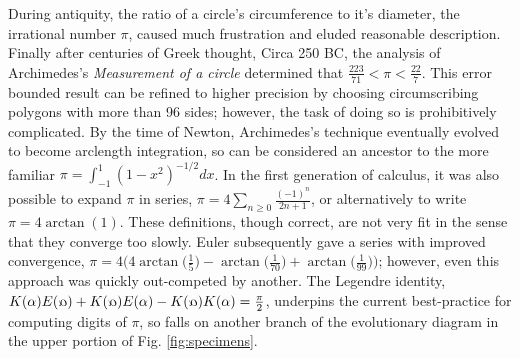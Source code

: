 \documentclass[nofootinbib,preprint]{revtex4-1}
\newcommand{\rev}[1]{\text{\reflectbox{$#1$}}}
\begin{document}
During antiquity, the ratio of a circle's circumference to it's diameter, the irrational number 
$\pi$, caused much frustration and eluded reasonable description. Finally after centuries of Greek 
thought, Circa 250 BC, the analysis of Archimedes's \textit{Measurement of a circle} determined 
that $\frac{223}{71}< \pi <\frac{22}{7}$. 
This error bounded result can be refined to higher precision by choosing circumscribing 
polygons with more than 96 sides; however, the task of doing so is prohibitively complicated. 
By the time of Newton, Archimedes's technique eventually evolved to become arclength 
integration, so can be considered an ancestor to the more familiar ${\pi = \int_{-1}^{1} (1-x^2)^{-1/2}dx}$. 
In the first generation of calculus, it was also possible to expand $\pi$ in 
series, $\pi=4\sum_{n\ge0} \frac{(-1)^n}{2n+1}$, or alternatively to write $\pi=4 \arctan(1)$. 
These definitions, though correct, are not very fit in the sense that they converge
too slowly. Euler subsequently gave a series with improved convergence,
${\pi = 4\Big(4\arctan\big(\tfrac{1}{5}\big)-\arctan\big(\tfrac{1}{70}\big)
+\arctan\big(\tfrac{1}{99}\big)\Big)}$; however, even this approach was quickly 
out-competed by another. The Legendre identity, 
$K(\alpha)E(\rev{\alpha})+K(\rev{\alpha})E(\alpha)-K(\rev{\alpha})K(\alpha)=\frac{\pi}{2}$,
underpins the current best-practice for computing digits of $\pi$, so falls on
another branch of the evolutionary diagram in the upper portion of Fig. \ref{fig:specimens}.
\end{document}
